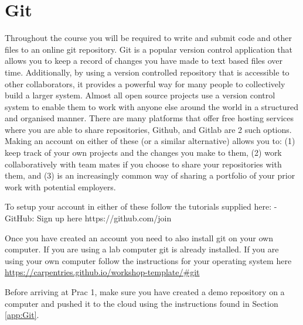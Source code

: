 \section{Git}
Throughout the course you will be required to write and submit code and other files to an online git repository.  Git is a popular version control application that allows you to keep a record of changes you have made to text based files over time.  Additionally, by using a version controlled repository that is accessible to other collaborators, it provides a powerful way for many people to collectively build a larger system.  Almost all open source projects use a version control system to enable them to work with anyone else around the world in a structured and organised manner.  There are many platforms that offer free hosting services where you are able to share repositories, Github, and Gitlab are 2 such options.  Making an account on either of these (or a similar alternative) allows you to: (1) keep track of your own projects and the changes you make to them, (2) work collaboratively with team mates if you choose to share your repositories with them, and (3) is an increasingly common way of sharing a portfolio of your prior work with potential employers.

To setup your account in either of these follow the tutorials supplied here:
- GitHub: Sign up here https://github.com/join

Once you have created an account you need to also install git on your own computer.  If you are using a lab computer git is already installed.  If you are using your own computer follow the instructions for your operating system here \href{https://carpentries.github.io/workshop-template/#git}{https://carpentries.github.io/workshop-template/#git}

Before arriving at Prac 1, make sure you have created a demo repository on a computer and pushed it to the cloud using the instructions found in Section \ref{app:Git}.

